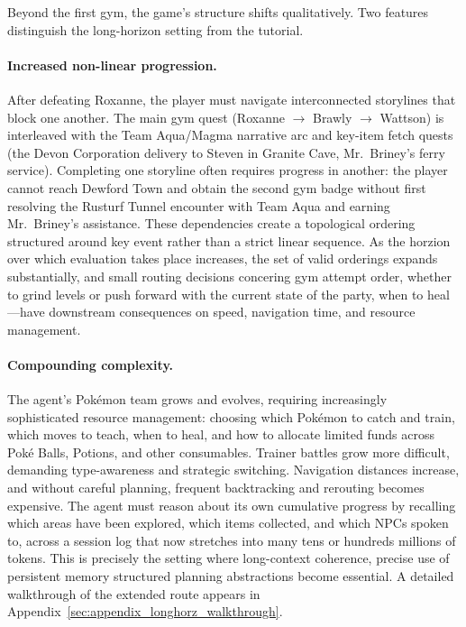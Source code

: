 Beyond the first gym, the game's structure shifts qualitatively. Two features distinguish the long-horizon setting from the tutorial.

\paragraph{Increased non-linear progression.} After defeating Roxanne, the player must navigate interconnected storylines that block one another. The main gym quest (Roxanne $\to$ Brawly $\to$ Wattson) is interleaved with the Team Aqua/Magma narrative arc and key-item fetch quests (the Devon Corporation delivery to Steven in Granite Cave, Mr.\ Briney's ferry service). Completing one storyline often requires progress in another: the player cannot reach Dewford Town and obtain the second gym badge without first resolving the Rusturf Tunnel encounter with Team Aqua and earning Mr.\ Briney's assistance. These dependencies create a topological ordering structured around key event rather than a strict linear sequence. As the horzion over which evaluation takes place increases, the set of valid orderings expands substantially, and small routing decisions concering gym attempt order, whether to grind levels or push forward with the current state of the party, when to heal---have downstream consequences on speed, navigation time, and resource management.

\paragraph{Compounding complexity.} The agent's Pok\'{e}mon team grows and evolves, requiring increasingly sophisticated resource management: choosing which Pok\'{e}mon to catch and train, which moves to teach, when to heal, and how to allocate limited funds across Pok\'{e} Balls, Potions, and other consumables. Trainer battles grow more difficult, demanding type-awareness and strategic switching. Navigation distances increase, and without careful planning, frequent backtracking and rerouting becomes expensive. The agent must reason about its own cumulative progress by recalling which areas have been explored, which items collected, and which NPCs spoken to, across a session log that now stretches into many tens or hundreds millions of tokens. This is precisely the setting where long-context coherence, precise use of persistent memory structured planning abstractions become essential. A detailed walkthrough of the extended route appears in Appendix~\ref{sec:appendix_longhorz_walkthrough}.


